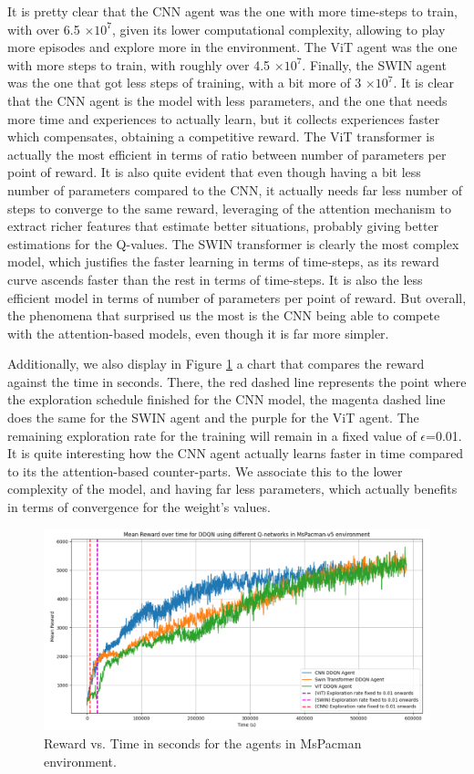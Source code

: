 It is pretty clear that the CNN agent was the one with more time-steps to train, with over 6.5 $\times 10^7$, given its lower computational complexity, allowing to play more episodes and explore more in the environment. The ViT agent was the one with more steps to train, with roughly over 4.5 $\times 10^7$. Finally, the SWIN agent was the one that got less steps of training, with a bit more of 3 $\times 10^7$. It is clear that the CNN agent is the model with less parameters, and the one that needs more time and experiences to actually learn, but it collects experiences faster which compensates, obtaining a competitive reward. The ViT transformer is actually the most efficient in terms of ratio between number of parameters per point of reward. It is also quite evident that even though having a bit less number of parameters compared to the CNN, it actually needs far less number of steps to converge to the same reward, leveraging of the attention mechanism to extract richer features that estimate better situations, probably giving better estimations for the Q-values. The SWIN transformer is clearly the most complex model, which justifies the faster learning in terms of time-steps, as its reward curve ascends faster than the rest in terms of time-steps. It is also the less efficient model in terms of number of parameters per point of reward. But overall, the phenomena that surprised us the most is the CNN being able to compete with the attention-based models, even though it is far more simpler. 

Additionally, we also display in Figure \ref{fig:pacmanfinalresultsinseconds}  a chart that compares the reward against the time in seconds. There, the red dashed line represents the point where the exploration schedule finished for the CNN model, the magenta dashed line does the same for the SWIN agent and the purple for the ViT agent. The remaining exploration rate for the training will remain in a fixed value of $\epsilon$=0.01. It is quite interesting how the CNN agent actually learns faster in time compared to its the attention-based counter-parts. We associate this to the lower complexity of the model, and having far less parameters, which actually benefits in terms of convergence for the weight's values. 

\begin{figure}[!h]
	\centering
	\includegraphics[width=\linewidth]{figures/pacman_final_results_in_seconds}
	\caption{Reward vs. Time in seconds for the agents in MsPacman environment.}
	\label{fig:pacmanfinalresultsinseconds}
\end{figure}

